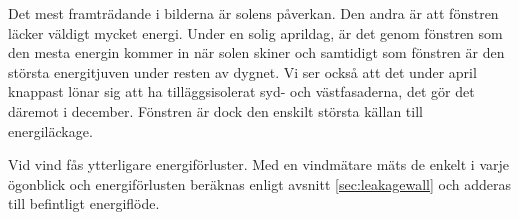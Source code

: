 Det mest framträdande i bilderna är solens påverkan. Den andra är att fönstren läcker väldigt 
mycket energi. Under en solig aprildag, är det genom fönstren som den mesta energin 
kommer in när solen skiner och samtidigt som fönstren är den största energitjuven under 
resten av dygnet. Vi ser också att det under april knappast lönar sig att ha tilläggsisolerat syd-
 och västfasaderna, det gör det däremot i december. Fönstren är dock den enskilt största 
 källan till energiläckage.

Vid vind fås ytterligare energiförluster. Med en vindmätare mäts de enkelt i varje ögonblick och 
energiförlusten beräknas enligt avsnitt \ref{sec:leakagewall} och adderas till befintligt energiflöde.
 